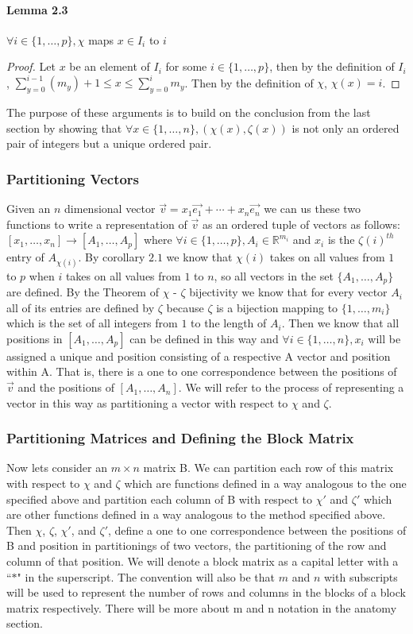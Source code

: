 \documentclass{article}
\begin{document}
\paragraph{Lemma 2.3}
$\forall i \in \{1, \ldots, p\}, \chi$ maps $x \in I_i$ to $i$
\begin{proof}
Let $x$ be an element of $I_i$ for some $i \in \{1, \ldots, p\}$, then by the definition of $I_i$, $\sum_{y = 0}^{i - 1}(m_y) + 1 \leq x \leq \sum_{y = 0}^im_y$. Then by the definition of $\chi$, $\chi(x) = i$.
\end{proof}
The purpose of these arguments is to build on the conclusion from the last section by showing that $\forall x \in \{1, \ldots, n\}, (\chi(x), \zeta(x))$ is not only an ordered pair of integers but a unique ordered pair.
\subsubsection{Partitioning Vectors}
Given an $n$ dimensional vector $\vec{v} = x_1\vec{e_1} + \cdots + x_n\vec{e_n}$ we can us these two functions to write a representation of $\vec{v}$ as an ordered tuple of vectors as follows: $[x_1, \ldots, x_n] \rightarrow [A_1, \ldots, A_p]$ where $\forall i \in \{1, \ldots, p\}, A_i \in \mathbb{R}^{m_i}$ and $x_i$ is the $\zeta(i)^{th}$ entry of $A_{\chi(i)}$. By corollary $2.1$ we know that $\chi(i)$ takes on all values from $1$ to $p$ when $i$ takes on all values from $1$ to $n$, so all vectors in the set $\{A_1, \ldots, A_p\}$ are defined. By the Theorem of $\chi$ - $\zeta$ bijectivity we know that for every vector $A_i$ all of its entries are defined by $\zeta$ because $\zeta$ is a bijection mapping to $\{1, \ldots, m_i\}$ which is the set of all integers from $1$ to the length of $A_i$. Then we know that all positions in $[A_1, \ldots, A_p]$ can be defined in this way and $\forall i \in \{1, \ldots, n\}, x_i$ will be assigned a unique and position consisting of a respective A vector and position within A. That is, there is a one to one correspondence between the positions of $\vec{v}$ and the positions of $[A_1, \ldots, A_n]$. We will refer to the process of representing a vector in this way as partitioning a vector with respect to $\chi$ and $\zeta$.
\subsubsection{Partitioning Matrices and Defining the Block Matrix}
Now lets consider an $m \times n$ matrix B. We can partition each row of this matrix with respect to $\chi$ and $\zeta$ which are functions defined in a way analogous to the one specified above and partition each column of B with respect to $\chi'$ and $\zeta'$ which are other functions defined in a way analogous to the method specified above. Then $\chi$, $\zeta$, $\chi'$, and $\zeta'$, define a one to one correspondence between the positions of B and position in partitionings of two vectors, the partitioning of the row and column of that position. We will denote a block matrix as a capital letter with a ``$*$" in the superscript. The convention will also be that $m$ and $n$ with subscripts will be used to represent the number of rows and columns in the blocks of a block matrix respectively. There will be more about m and n notation in the anatomy section.
\end{document}
